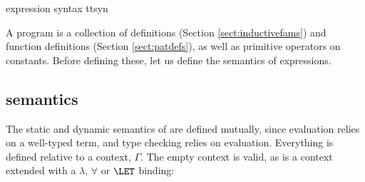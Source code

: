 {\TT{} expression syntax}
{ttsyn}

A \TT{} program is a collection of  definitions (Section 
\ref{sect:inductivefams}) and  function definitions (Section
\ref{sect:patdefs}), as well as primitive operators on constants. 
Before defining these, let us define the semantics of \TT{}
expressions.

\subsection{\TT{} semantics}

The static and dynamic semantics of \TT{} are defined mutually, since
evaluation relies on a well-typed term, and type checking relies on 
evaluation. Everything is defined relative
to a context, $\Gamma$. The empty context
is valid, as is a context extended with a $\lambda$, $\forall$ or
$\LET$ binding:


